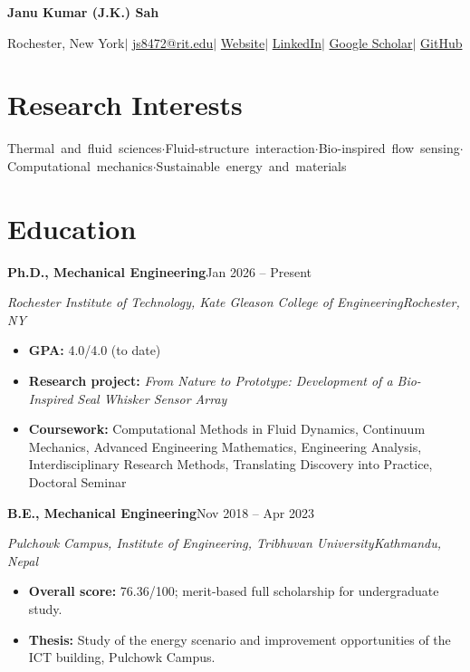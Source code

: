 \documentclass[10pt,letterpaper]{article}
\newcommand{\entry}[4]{\textbf{#1}\hfill #2\par\textit{#3}\hfill\textit{#4}\par}
\newcommand{\dotsep}{\nobreak\hspace{0.5em}$\cdot$\hspace{0.5em}\ignorespaces}
\begin{document}
\begin{center}
  {\fontsize{26}{30}\selectfont\sffamily\bfseries\color{ink} Janu Kumar (J.K.) Sah}\par
  \vspace{6pt}
  Rochester, New York\enspace$|$\enspace%
  \href{mailto:js8472@rit.edu}{js8472@rit.edu}\enspace$|$\enspace%
  \href{https://jk-sah.github.io}{Website}\enspace$|$\enspace%
  \href{https://www.linkedin.com/in/jk-sah/}{LinkedIn}\enspace$|$\enspace%
  \href{https://scholar.google.com/citations?user=Iraldw0AAAAJ&hl=en}{Google Scholar}\enspace$|$\enspace%
  \href{https://github.com/JK-Sah}{GitHub}
\end{center}
\vspace{-4pt}

\section*{Research Interests}
{\raggedright\mbox{Thermal and fluid sciences}\dotsep \mbox{Fluid-structure interaction}\dotsep \mbox{Bio-inspired flow sensing}\dotsep \mbox{Computational mechanics}\dotsep \mbox{Sustainable energy and materials}\par}

\section*{Education}
\entry{Ph.D., Mechanical Engineering}{Jan 2026 -- Present}{Rochester Institute of Technology, Kate Gleason College of Engineering}{Rochester, NY}
\begin{itemize}
  \item \textbf{GPA:} 4.0/4.0 (to date)
  \item \textbf{Research project:} \textit{From Nature to Prototype: Development of a Bio-Inspired Seal Whisker Sensor Array}
  \item \textbf{Coursework:} Computational Methods in Fluid Dynamics, Continuum Mechanics, Advanced Engineering Mathematics, Engineering Analysis, Interdisciplinary Research Methods, Translating Discovery into Practice, Doctoral Seminar
\end{itemize}
\entry{B.E., Mechanical Engineering}{Nov 2018 -- Apr 2023}{Pulchowk Campus, Institute of Engineering, Tribhuvan University}{Kathmandu, Nepal}
\begin{itemize}
  \item \textbf{Overall score:} 76.36/100; merit-based full scholarship for undergraduate study.
  \item \textbf{Thesis:} Study of the energy scenario and improvement opportunities of the ICT building, Pulchowk Campus.
\end{itemize}
\end{document}
